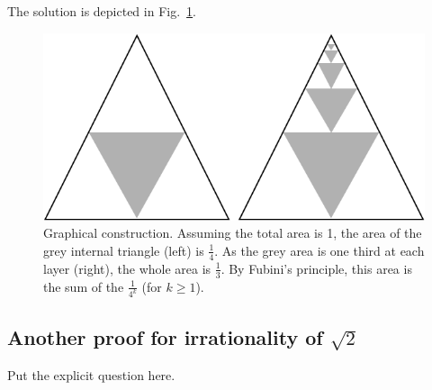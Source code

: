 The solution is depicted in Fig.~\ref{Fig:SUmgeo1sur4}. 
\begin{figure}
\begin{center}
        \includegraphics[scale=0.3]{FiguresArithmetic/SumGeometric1sur4}
        \caption{Graphical construction. Assuming the total area is 1, the area of the grey internal triangle (left) is $\frac{1}{4}$.
        As the grey area is one third at each layer (right), the whole area is $\frac{1}{3}$.
        By Fubini's principle, this area is the sum of the $\frac{1}{4^k}$ (for $k \geq 1$).}
        \label{Fig:SUmgeo1sur4}
\end{center}
\end{figure}

\subsection{Another proof for irrationality of $\sqrt{2}$}

Put the explicit question here.

